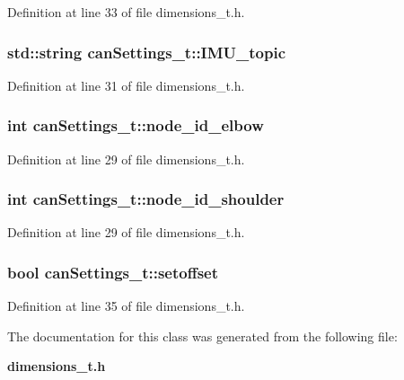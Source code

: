 \-Definition at line 33 of file dimensions\-\_\-t.\-h.

\subsubsection[{\-I\-M\-U\-\_\-topic}]{\setlength{\rightskip}{0pt plus 5cm}std\-::string {\bf can\-Settings\-\_\-t\-::\-I\-M\-U\-\_\-topic}}\label{classcanSettings__t_a5c9b45357b5240ba4430f95949160c05}


\-Definition at line 31 of file dimensions\-\_\-t.\-h.

\subsubsection[{node\-\_\-id\-\_\-elbow}]{\setlength{\rightskip}{0pt plus 5cm}int {\bf can\-Settings\-\_\-t\-::node\-\_\-id\-\_\-elbow}}\label{classcanSettings__t_a8758ff3e0eb56ed57cca415f7264ec1b}


\-Definition at line 29 of file dimensions\-\_\-t.\-h.

\subsubsection[{node\-\_\-id\-\_\-shoulder}]{\setlength{\rightskip}{0pt plus 5cm}int {\bf can\-Settings\-\_\-t\-::node\-\_\-id\-\_\-shoulder}}\label{classcanSettings__t_a2d45fb5928637472c1b7f49ce9b8fae0}


\-Definition at line 29 of file dimensions\-\_\-t.\-h.

\subsubsection[{setoffset}]{\setlength{\rightskip}{0pt plus 5cm}bool {\bf can\-Settings\-\_\-t\-::setoffset}}\label{classcanSettings__t_a06ae8a7b8fc947c101f2bc43f3f2765c}


\-Definition at line 35 of file dimensions\-\_\-t.\-h.



\-The documentation for this class was generated from the following file\-:\begin{DoxyCompactItemize}
\item 
{\bf dimensions\-\_\-t.\-h}\end{DoxyCompactItemize}
